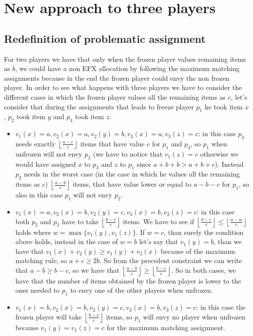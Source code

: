 \documentclass{article}
\newcommand{\floor}[3][2]{\left \lfloor\frac{#2}{#3}\right \rfloor}
\begin{document}
\section{New approach to three players}
\subsection{Redefinition of problematic assignment}
For two players we have that only when the frozen player values remaining items as $b$, we could have a non EFX allocation by following the maximum matching assignments because in the end the frozen player could envy the non frozen player. In order to see what happens with three players we have to consider the different cases in which the frozen player values all the remaining items as $c$, let's consider that during the assignments that leads to freeze player $p_1$ he took item $x$, $p_2$ took item $y$ and $p_3$ took item $z$: 
\begin{itemize}
    \item $v_1(x) = a, v_2(x) = a, v_2(y) = b, v_3(x) = a, v_3(z) = c$: in this case $p_3$ needs exactly $\floor{a-c}{c}$ items that have value $c$ for $p_1$ and $p_3$, so $p_1$ when unfrozen will not envy $p_3$ (we have to notice that $v_1(z) = c$ otherwise we would have assigned $x$ to $p_3$ and $z$ to $p_1$ since $a + b + b > a + b + c$). Instead $p_2$ needs in the worst case (in the case in which he values all the remaining items as $c$) $\floor{a-b}{c}$ items, that have value lower or equal to $a-b-c$ for $p_1$, so also in this case $p_1$ will not envy $p_2$.
    
    \item $v_1(x) = a, v_2(x) = b, v_2(y) = c, v_3(x) = b, v_3(z) = c$: in this case both $p_2$ and $p_3$ have to take $\floor{b-c}{c}$ items. We have to see if $\floor{b-c}{c}\le \floor{a-w}{c}$ holds where $w=\max\{v_1(y), v_1(z)\}$. If $w=c$, than surely the condition above holds, instead in the case of $w=b$ let's say that $v_1(y) = b$, than we have that $v_1(x) + v_2(y) \ge v_1(y) + v_2(x)$ because of the maximum matching rule, so $a + c \ge 2b$. So from the precedent constraint we can write that $a -b \ge b-c$, so we have that $\floor{a-b}{c} \ge \floor{b-c}{c}$. So in both cases, we have that the number of items obtained by the frozen player is lower to the ones needed to $p_1$ to envy one of the other players when unfrozen.
    
    \item $v_1(x) = b, v_2(x) = b, v_2(y) = c, v_3(x) = b, v_3(z) = c$: in this case the frozen player will take $\floor{b-c}{c}$ items, so $p_1$ will envy no player when unfrozen because $v_1(y) = v_1(z) = c$ for the maximum matching assignment.
\end{itemize}
\end{document}
